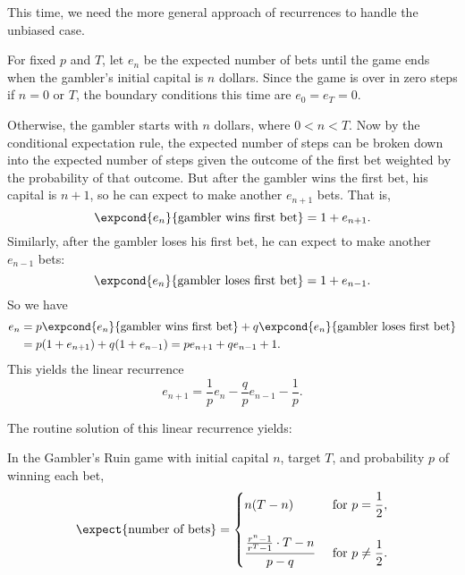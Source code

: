 This time, we need the more general approach of recurrences to handle the
unbiased case.  
\fi

For fixed $p$ and $T$, let $e_n$ be the expected number of bets until
the game ends when the gambler's initial capital is $n$ dollars.
Since the game is over in zero steps if $n=0$ or $T$, the boundary
conditions this time are $e_0=e_T=0$.

Otherwise, the gambler starts with $n$ dollars, where $0 < n < T$.
Now by the conditional expectation rule, the expected number of steps
can be broken down into the expected number of steps given the outcome
of the first bet weighted by the probability of that outcome.  But
after the gambler wins the first bet, his capital is $n+1$, so he can
expect to make another $e_{n+1}$ bets.
That is,
\[
\expcond{e_n}{\text{gambler wins first bet}} = 1 + e_{n+1}.
\]
Similarly, after the gambler loses his first bet, he can expect to
make another $e_{n-1}$ bets:
\[
\expcond{e_n}{\text{gambler loses first bet}} = 1 + e_{n-1}.
\]
So we have
\begin{align*}
e_n & = p\expcond{e_n}{\text{gambler wins first bet}} +
      q\expcond{e_n}{\text{gambler loses first bet}}\\
    & = p(1 + e_{n+1}) +  q(1 + e_{n-1}) =  pe_{n+1} + qe_{n-1} + 1.
\end{align*}
This yields the linear recurrence
\begin{equation}\label{expected-bets-recurrence}
e_{n+1} = \frac{1}{p} e_n - \frac{q}{p} e_{n-1} - \frac{1}{p}.
\end{equation}
\iffalse
For $p = q = 1/2$, this simplifies to
\begin{equation}\label{expected-fair-bets-recurrence}
e_{n+1} = 2e_n - e_{n-1} - 2.
\end{equation}

\fi

The routine solution of this linear recurrence yields:
\begin{theorem}\label{ExQthm}
In the Gambler's Ruin game with initial capital $n$, target
$T$, and probability $p$ of winning each bet,
\begin{equation}\label{expectedbets}
\expect{\text{number of bets}} =
 \begin{cases}
 n(T-n) & \text{ for } p = \dfrac{1}{2},\\
          \\ 
\dfrac{\frac{r^n - 1}{r^T - 1}%
  \cdot T - n}{p-q}
       & \text{ for } p \neq \dfrac{1}{2}.
\end{cases}
\end{equation}
\end{theorem}

